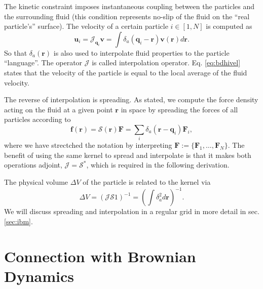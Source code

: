 \documentclass[ twoside,openright,titlepage,numbers=noenddot,%
headinclude,footinclude,cleardoublepage=empty,abstract=on,
BCOR=5mm,paper=a4,fontsize=11pt, dvipsnames
]{scrreprt}
\renewcommand{\vec}[1]{\bm{#1}}
\newcommand{\oper}[1]{\mathcal{#1}}
\newcommand{\ppos}{q}
\newcommand{\pvel}{u}
\newcommand{\fpos}{r}
\newcommand{\fvel}{v}
\begin{document}
The kinetic constraint imposes instantaneous coupling between the particles and the surrounding fluid (this condition represents no-slip of the fluid on the ``real particle's'' surface). The velocity of a certain particle $i\in [1,N]$ is computed as
\begin{equation}
  \label{eq:bdhifvel}
  \vec{\pvel}_i= \oper{J}_{\vec{\ppos}_i}\vec{\fvel} =\int{\delta_a(\vec{\ppos}_i - \vec{\fpos})\vec{\fvel}(\vec{\fpos})d\vec{\fpos}}.
\end{equation}
So that $\delta_a(\vec{\fpos})$ is also used  to interpolate fluid properties to the particle ``language''.
The operator $\oper{J}$ is called interpolation operator. Eq. \eqref{eq:bdhivel} states that the velocity of the particle is equal to the local average of the fluid velocity.

The reverse of interpolation is spreading. As stated, we compute the force density acting on the fluid at a given point $\vec{\fpos}$ in space by spreading the forces of all particles according to
\begin{equation}
  \label{eq:spreadoper}
  \vec{f}(\vec{\fpos}) = \oper{S}(\vec{\fpos})\vec{F} = \sum_i\delta_a(\vec{\fpos}-\vec{\ppos}_i)\vec{F}_i,
\end{equation}
where we have strectched the notation by interpreting $\vec{F} := \{\vec{F}_1,\dots,\vec{F}_N\}$.
The benefit of using the same kernel to spread and interpolate is that it makes both operations adjoint, $\oper{J} = \oper{S}^*$, which is required in the following derivation\cite{Delong2014}.

The physical volume $\Delta V$ of the particle is related to the kernel via
\begin{equation}
  \Delta V = (\oper{J}\oper{S}1)^{-1} = \left(\int\delta_a^2d\vec{r}\right)^{-1}.
\end{equation}
We will discuss spreading and interpolation in a regular grid in more detail in sec. \ref{sec:ibm}.

\section{Connection with Brownian Dynamics}\label{sec:bdhicon}
\end{document}
